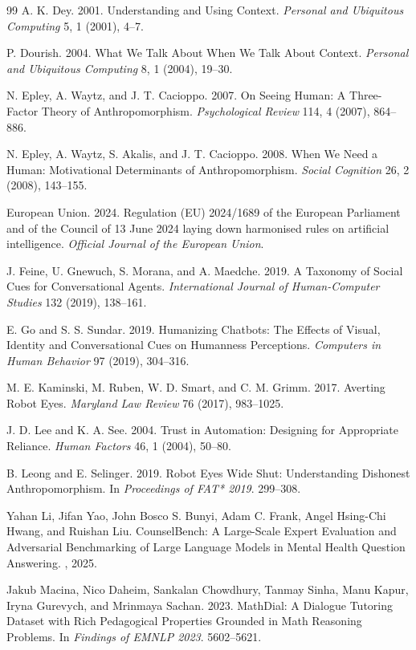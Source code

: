 \documentclass[manuscript,review,anonymous]{acmart}
\begin{document}
\begin{thebibliography}{99}
A. K. Dey.
2001.
Understanding and Using Context.
\textit{Personal and Ubiquitous Computing} 5, 1 (2001), 4--7.

P. Dourish.
2004.
What We Talk About When We Talk About Context.
\textit{Personal and Ubiquitous Computing} 8, 1 (2004), 19--30.

N. Epley, A. Waytz, and J. T. Cacioppo.
2007.
On Seeing Human: A Three-Factor Theory of Anthropomorphism.
\textit{Psychological Review} 114, 4 (2007), 864--886.

N. Epley, A. Waytz, S. Akalis, and J. T. Cacioppo.
2008.
When We Need a Human: Motivational Determinants of Anthropomorphism.
\textit{Social Cognition} 26, 2 (2008), 143--155.

European Union. 2024. Regulation (EU) 2024/1689 of the European Parliament and of the Council of 13 June 2024 laying down harmonised rules on artificial intelligence. \textit{Official Journal of the European Union}.

J. Feine, U. Gnewuch, S. Morana, and A. Maedche.
2019.
A Taxonomy of Social Cues for Conversational Agents.
\textit{International Journal of Human-Computer Studies} 132 (2019), 138--161.

E. Go and S. S. Sundar.
2019.
Humanizing Chatbots: The Effects of Visual, Identity and Conversational Cues on Humanness Perceptions.
\textit{Computers in Human Behavior} 97 (2019), 304--316.

M. E. Kaminski, M. Ruben, W. D. Smart, and C. M. Grimm.
2017.
Averting Robot Eyes.
\textit{Maryland Law Review} 76 (2017), 983--1025.

J. D. Lee and K. A. See.
2004.
Trust in Automation: Designing for Appropriate Reliance.
\textit{Human Factors} 46, 1 (2004), 50--80.

B. Leong and E. Selinger.
2019.
Robot Eyes Wide Shut: Understanding Dishonest Anthropomorphism.
In \textit{Proceedings of FAT* 2019}. 299--308.

Yahan Li, Jifan Yao, John Bosco S. Bunyi, Adam C. Frank, Angel Hsing-Chi Hwang, and Ruishan Liu.
\newblock Counsel{B}ench: A {L}arge-{S}cale {E}xpert {E}valuation and {A}dversarial {B}enchmarking of {L}arge {L}anguage {M}odels in {M}ental {H}ealth {Q}uestion {A}nswering.
, 2025.

Jakub Macina, Nico Daheim, Sankalan Chowdhury, Tanmay Sinha, Manu Kapur, Iryna Gurevych, and Mrinmaya Sachan. 2023.
MathDial: A Dialogue Tutoring Dataset with Rich Pedagogical Properties Grounded in Math Reasoning Problems.
In \textit{Findings of EMNLP 2023}. 5602--5621.


\end{thebibliography}
\end{document}
